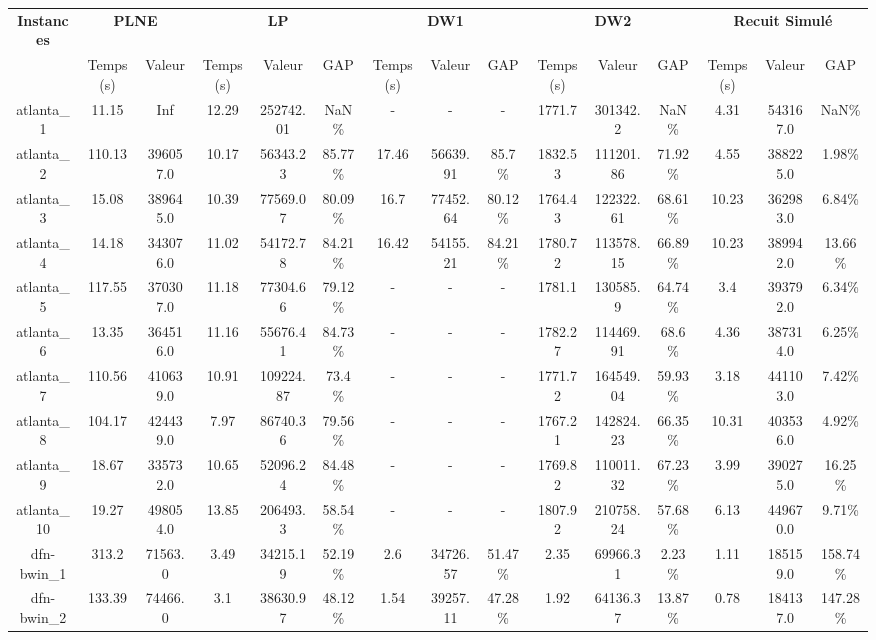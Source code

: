 \documentclass[main.tex]{subfiles}
\begin{document}
\thispagestyle{empty}

\begin{landscape}
\begin{table}[h]
    \centering
    \begin{tabular}{c|cc|ccc|ccc|ccc|ccc}
	\hline	
	\textbf{Instances} &\multicolumn{2}{c}{\textbf{PLNE}} &\multicolumn{3}{c}{\textbf{LP}} &\multicolumn{3}{c}{\textbf{DW1}} &\multicolumn{3}{c}{\textbf{DW2}} &\multicolumn{3}{c}{\textbf{Recuit Simulé}}\\
	 &Temps(s) &Valeur &Temps(s) &Valeur &GAP &Temps(s) &Valeur &GAP &Temps(s) &Valeur &GAP &Temps(s) &Valeur &GAP\\

	\hline
	atlanta\_1 &11.15 &Inf &12.29 &252742.01 &NaN\% &- &- &- &1771.7 &301342.2 &NaN\% &4.31 &543167.0 &NaN\%\\
	atlanta\_2 &110.13 &396057.0 &10.17 &56343.23 &85.77\% &17.46 &56639.91 &85.7\% &1832.53 &111201.86 &71.92\% &4.55 &388225.0 &1.98\%\\
	atlanta\_3 &15.08 &389645.0 &10.39 &77569.07 &80.09\% &16.7 &77452.64 &80.12\% &1764.43 &122322.61 &68.61\% &10.23 &362983.0 &6.84\%\\
	atlanta\_4 &14.18 &343076.0 &11.02 &54172.78 &84.21\% &16.42 &54155.21 &84.21\% &1780.72 &113578.15 &66.89\% &10.23 &389942.0 &13.66\%\\
	atlanta\_5 &117.55 &370307.0 &11.18 &77304.66 &79.12\% &- &- &- &1781.1 &130585.9 &64.74\% &3.4 &393792.0 &6.34\%\\
	atlanta\_6 &13.35 &364516.0 &11.16 &55676.41 &84.73\% &- &- &- &1782.27 &114469.91 &68.6\% &4.36 &387314.0 &6.25\%\\
	atlanta\_7 &110.56 &410639.0 &10.91 &109224.87 &73.4\% &- &- &- &1771.72 &164549.04 &59.93\% &3.18 &441103.0 &7.42\%\\
	atlanta\_8 &104.17 &424439.0 &7.97 &86740.36 &79.56\% &- &- &- &1767.21 &142824.23 &66.35\% &10.31 &403536.0 &4.92\%\\
	atlanta\_9 &18.67 &335732.0 &10.65 &52096.24 &84.48\% &- &- &- &1769.82 &110011.32 &67.23\% &3.99 &390275.0 &16.25\%\\
	atlanta\_10 &19.27 &498054.0 &13.85 &206493.3 &58.54\% &- &- &- &1807.92 &210758.24 &57.68\% &6.13 &449670.0 &9.71\%\\
	dfn-bwin\_1 &313.2 &71563.0 &3.49 &34215.19 &52.19\% &2.6 &34726.57 &51.47\% &2.35 &69966.31 &2.23\% &1.11 &185159.0 &158.74\%\\
	dfn-bwin\_2 &133.39 &74466.0 &3.1 &38630.97 &48.12\% &1.54 &39257.11 &47.28\% &1.92 &64136.37 &13.87\% &0.78 &184137.0 &147.28\%\\

\end{tabular}
\end{table}
\end{landscape}
\end{document}
